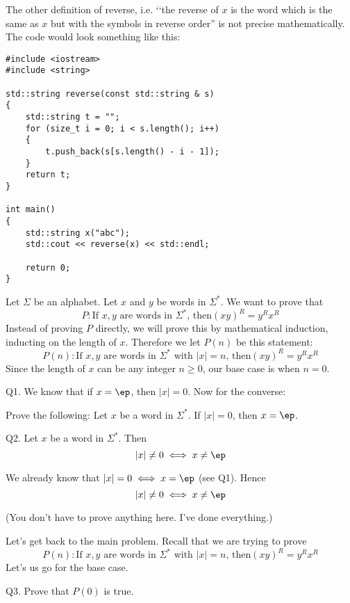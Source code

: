 The other definition of reverse, i.e. \lq\lq the reverse of 
$x$ is the word which is the same as $x$ but with the
symbols in reverse order'' is not precise mathematically.
The code would look something like this:
\begin{Verbatim}[frame=single]
#include <iostream>
#include <string>

std::string reverse(const std::string & s)
{
    std::string t = "";
    for (size_t i = 0; i < s.length(); i++)
    {
        t.push_back(s[s.length() - i - 1]);
    }
    return t;
}

int main()
{
    std::string x("abc");
    std::cout << reverse(x) << std::endl;
    
    return 0;
}
\end{Verbatim}

\newpage

Let $\Sigma$ be an alphabet.
Let $x$ and $y$ be words in $\Sigma^*$.
We want to prove that 
\[
P:
\text{
If $x,y$ are words in $\Sigma^*$, then
$(xy)^R = y^R x^R$
}
\]
Instead of proving $P$ directly, 
we will prove this by mathematical induction,
inducting on the length of $x$.
Therefore we let $P(n)$ be this statement:
\[
P(n): 
\text{
If $x,y$ are words in $\Sigma^*$ with $|x| = n$, then
$(xy)^R = y^R x^R$
}
\]
Since the length of $x$ can be any integer $n \geq 0$,
our base case is when $n = 0$.


\newpage



Q1. We know that if $x = \ep$, then $|x| = 0$.
Now for the converse:

Prove the following:
Let $x$ be a word in $\Sigma^*$.
If $|x| = 0$, then $x = \ep$.

\SOLUTION

\newpage

Q2. Let $x$ be a word in $\Sigma^*$.
Then 
\[
|x| \neq 0 \iff x \neq \ep
\]

\SOLUTION
We already know that $|x| = 0 \iff x = \ep$ (see Q1).
Hence
\[
|x| \neq 0 \iff x \neq \ep
\]

(You don't have to prove anything here. I've done everything.)


\newpage
Let's get back to the main problem.
Recall that we are trying to prove
\[
P(n): 
\text{
If $x,y$ are words in $\Sigma^*$ with $|x| = n$, then
$(xy)^R = y^R x^R$
}
\]
Let's us go for the base case.

Q3. 
Prove that $P(0)$ is true.

\SOLUTION

\newpage

